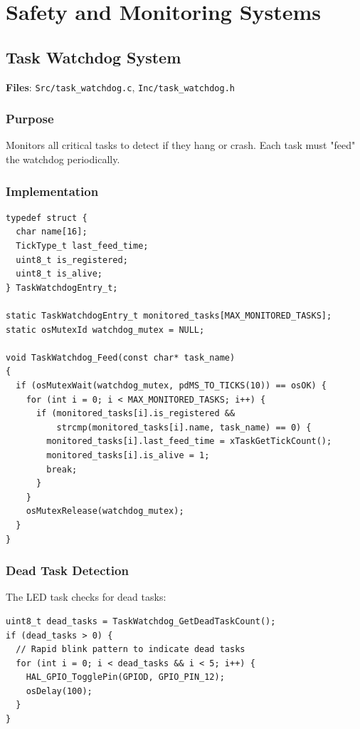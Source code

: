 \documentclass[11pt,a4paper]{article}
\begin{document}
\section{Safety and Monitoring Systems}

\subsection{Task Watchdog System}
\textbf{Files}: \texttt{Src/task\_watchdog.c}, \texttt{Inc/task\_watchdog.h}

\subsubsection{Purpose}
Monitors all critical tasks to detect if they hang or crash. Each task must "feed" the watchdog periodically.

\subsubsection{Implementation}
\begin{lstlisting}[caption=Task Watchdog Structure, label=lst:taskwdg]
typedef struct {
  char name[16];
  TickType_t last_feed_time;
  uint8_t is_registered;
  uint8_t is_alive;
} TaskWatchdogEntry_t;

static TaskWatchdogEntry_t monitored_tasks[MAX_MONITORED_TASKS];
static osMutexId watchdog_mutex = NULL;

void TaskWatchdog_Feed(const char* task_name)
{
  if (osMutexWait(watchdog_mutex, pdMS_TO_TICKS(10)) == osOK) {
    for (int i = 0; i < MAX_MONITORED_TASKS; i++) {
      if (monitored_tasks[i].is_registered && 
          strcmp(monitored_tasks[i].name, task_name) == 0) {
        monitored_tasks[i].last_feed_time = xTaskGetTickCount();
        monitored_tasks[i].is_alive = 1;
        break;
      }
    }
    osMutexRelease(watchdog_mutex);
  }
}
\end{lstlisting}

\subsubsection{Dead Task Detection}
The LED task checks for dead tasks:

\begin{lstlisting}[caption=Dead Task Detection, label=lst:deadtask]
uint8_t dead_tasks = TaskWatchdog_GetDeadTaskCount();
if (dead_tasks > 0) {
  // Rapid blink pattern to indicate dead tasks
  for (int i = 0; i < dead_tasks && i < 5; i++) {
    HAL_GPIO_TogglePin(GPIOD, GPIO_PIN_12);
    osDelay(100);
  }
}
\end{lstlisting}
\end{document}
